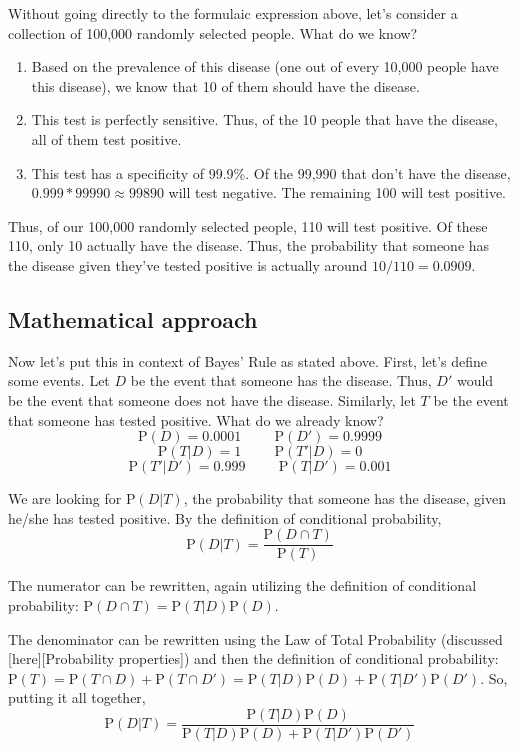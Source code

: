 \documentclass[
  letterpaper,
  DIV=11,
  numbers=noendperiod]{scrreprt}
\begin{document}
Without going directly to the formulaic expression above, let's consider
a collection of 100,000 randomly selected people. What do we know?

\begin{enumerate}
\def\labelenumi{\arabic{enumi})}
\item
  Based on the prevalence of this disease (one out of every 10,000
  people have this disease), we know that 10 of them should have the
  disease.
\item
  This test is perfectly sensitive. Thus, of the 10 people that have the
  disease, all of them test positive.
\item
  This test has a specificity of 99.9\%. Of the 99,990 that don't have
  the disease, \(0.999*99990\approx 99890\) will test negative. The
  remaining 100 will test positive.
\end{enumerate}

Thus, of our 100,000 randomly selected people, 110 will test positive.
Of these 110, only 10 actually have the disease. Thus, the probability
that someone has the disease given they've tested positive is actually
around \(10/110 = 0.0909\).

\subsection{Mathematical approach}\label{mathematical-approach}

Now let's put this in context of Bayes' Rule as stated above. First,
let's define some events. Let \(D\) be the event that someone has the
disease. Thus, \(D'\) would be the event that someone does not have the
disease. Similarly, let \(T\) be the event that someone has tested
positive. What do we already know? \[
\mbox{P}(D) = 0.0001 \hspace{1cm} \mbox{P}(D')=0.9999 
\] \[
\mbox{P}(T|D)= 1 \hspace{1cm} \mbox{P}(T'|D)=0
\] \[
\mbox{P}(T'|D')=0.999 \hspace{1cm} \mbox{P}(T|D') = 0.001
\]

We are looking for \(\mbox{P}(D|T)\), the probability that someone has
the disease, given he/she has tested positive. By the definition of
conditional probability, \[
\mbox{P}(D|T)=\frac{\mbox{P}(D \cap T)}{\mbox{P}(T)}
\]

The numerator can be rewritten, again utilizing the definition of
conditional probability: \(\mbox{P}(D\cap T)=\mbox{P}(T|D)\mbox{P}(D)\).

The denominator can be rewritten using the Law of Total Probability
(discussed {[}here{]}{[}Probability properties{]}) and then the
definition of conditional probability:
\(\mbox{P}(T)=\mbox{P}(T\cap D) + \mbox{P}(T \cap D') = \mbox{P}(T|D)\mbox{P}(D) + \mbox{P}(T|D')\mbox{P}(D')\).
So, putting it all together, \[
\mbox{P}(D|T)=\frac{\mbox{P}(T|D)\mbox{P}(D)}{\mbox{P}(T|D)\mbox{P}(D) + \mbox{P}(T|D')\mbox{P}(D')}
\]
\end{document}
